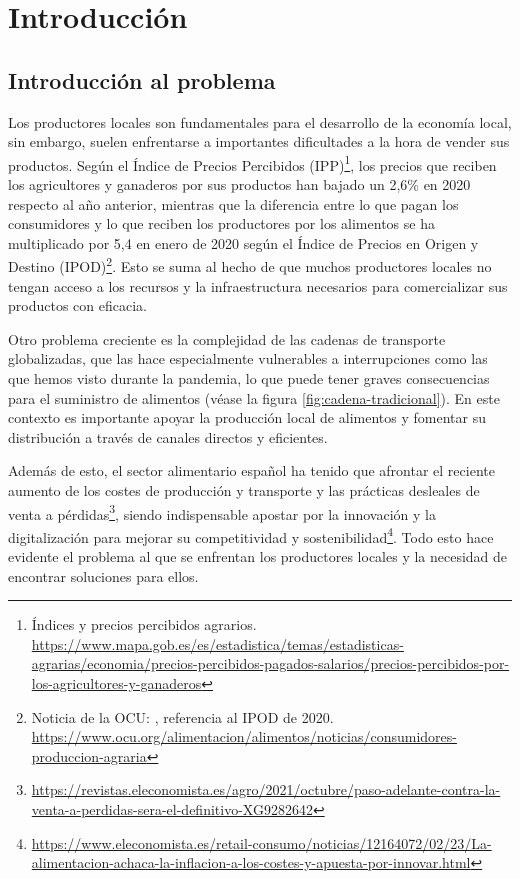 
\chapter{Introducción}\label{cap1} 

\section{Introducción al problema}\label{sec:intro}

Los productores locales son fundamentales para el desarrollo de la economía local, sin embargo, suelen enfrentarse a importantes dificultades a la hora de vender sus productos. Según el Índice de Precios Percibidos (IPP)\footnote{Índices y precios percibidos agrarios. \url{https://www.mapa.gob.es/es/estadistica/temas/estadisticas-agrarias/economia/precios-percibidos-pagados-salarios/precios-percibidos-por-los-agricultores-y-ganaderos}}, los precios que reciben los agricultores y ganaderos por sus productos han bajado un 2,6\% en 2020 respecto al año anterior, mientras que la diferencia entre lo que pagan los consumidores y lo que reciben los productores por los alimentos se ha multiplicado por 5,4 en enero de 2020 según el Índice de Precios en Origen y Destino (IPOD)\footnote{Noticia de la OCU: , referencia al IPOD de 2020. \url{https://www.ocu.org/alimentacion/alimentos/noticias/consumidores-produccion-agraria}}. Esto se suma al hecho de que muchos productores locales no tengan acceso a los recursos y la infraestructura necesarios para comercializar sus productos con eficacia.

Otro problema creciente es la complejidad de las cadenas de transporte globalizadas, que las hace especialmente vulnerables a interrupciones como las que hemos visto durante la pandemia, lo que puede tener graves consecuencias para el suministro de alimentos (véase la figura \ref{fig:cadena-tradicional}). En este contexto es importante apoyar la producción local de alimentos y fomentar su distribución a través de canales directos y eficientes.

Además de esto, el sector alimentario español ha tenido que afrontar el reciente aumento de los costes de producción y transporte y las prácticas desleales de venta a pérdidas\footnote{\url{https://revistas.eleconomista.es/agro/2021/octubre/paso-adelante-contra-la-venta-a-perdidas-sera-el-definitivo-XG9282642}}, siendo indispensable apostar por la innovación y la digitalización para mejorar su competitividad y sostenibilidad\footnote{\url{https://www.eleconomista.es/retail-consumo/noticias/12164072/02/23/La-alimentacion-achaca-la-inflacion-a-los-costes-y-apuesta-por-innovar.html}}. Todo esto hace evidente el problema al que se enfrentan los productores locales y la necesidad de encontrar soluciones para ellos.

